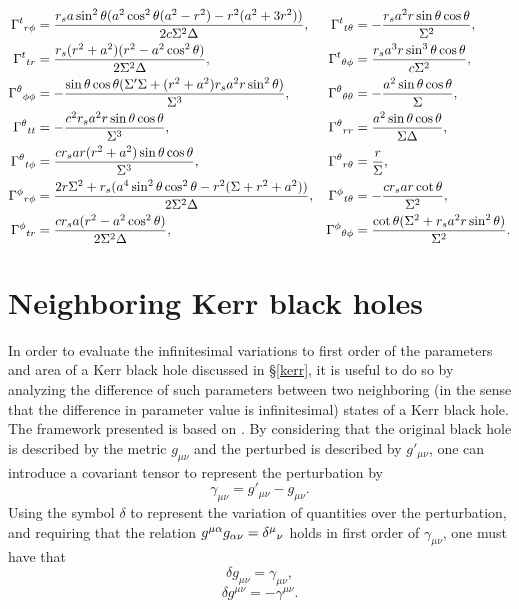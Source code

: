 \documentclass[
12pt,		%
openright,	%
twoside,  %
a4paper,			%
chapter=TITLE,		%
english,			%
french,				%
spanish,			%
brazil				%
]{USPSC-classe/USPSC}
\begin{document}
\begin{apendicesenv}
\begin{align*}
\Gamma^{t}\mathstrut_{r\phi}&=\frac{r_sa\sin^2{\theta}(a^2\cos^2{\theta}(a^2-r^2)-r^2(a^2+3r^2))}{2c\Sigma^2\Delta}, & \Gamma^{t}\mathstrut_{t\theta}&=-\frac{r_sa^2r\sin{\theta}\cos{\theta}}{\Sigma^2},\\
\Gamma^{t}\mathstrut_{tr}&=\frac{r_s(r^2+a^2)(r^2-a^2\cos^2{\theta})}{2\Sigma^2\Delta}, & \Gamma^{t}\mathstrut_{\theta\phi}&=\frac{r_sa^3r\sin^3{\theta}\cos{\theta}}{c\Sigma^2},\\
\Gamma^{\theta}\mathstrut_{\phi\phi}& =-\frac{\sin{\theta}\cos{\theta}(\Sigma'\Sigma+(r^2+a^2)r_sa^2r\sin^2{\theta})}{\Sigma^3},  &  \Gamma^{\theta}\mathstrut_{\theta\theta}&=-\frac{a^2\sin{\theta\cos{\theta}}}{\Sigma},\\
\Gamma^{\theta}\mathstrut_{tt}&=-\frac{c^2r_sa^2r\sin{\theta}\cos{\theta}}{\Sigma^3}, &  \Gamma^{\theta}\mathstrut_{rr}&=\frac{a^2\sin{\theta}\cos{\theta}}{\Sigma\Delta},\\
 \Gamma^{\theta}\mathstrut_{t\phi}&=\frac{cr_sar(r^2+a^2)\sin{\theta}\cos{\theta}}{\Sigma^3}, & \Gamma^{\theta}\mathstrut_{r\theta}&=\frac{r}{\Sigma},\\
 \Gamma^{\phi}\mathstrut_{r\phi}&=\frac{2r\Sigma^2+r_s(a^4\sin^2{\theta}\cos^2{\theta}-r^2(\Sigma+r^2+a^2))}{2\Sigma^2\Delta}, &  \Gamma^{\phi}\mathstrut_{t\theta}&=-\frac{cr_sar\cot{\theta}}{\Sigma^2},\\
 \Gamma^{\phi}\mathstrut_{tr}&=\frac{cr_sa(r^2-a^2\cos^2{\theta})}{2\Sigma^2\Delta}, &  \Gamma^{\phi}\mathstrut_{\theta\phi}&=\frac{\cot{\theta}(\Sigma^2+r_sa^2r\sin^2{\theta})}{\Sigma^2}.
\end{align*}

\section{Neighboring Kerr black holes}\label{B2}

In order to evaluate the infinitesimal variations to first order of the parameters and area of a Kerr black hole discussed in \S\;\ref{kerr}, it is useful to do so by analyzing the difference of such parameters between two neighboring (in the sense that the difference in parameter value is infinitesimal) states of a Kerr black hole. The framework presented is based on \cite{Bardeen1973}. By considering that the original black hole is described by the metric $g_{\mu\nu}$ and the perturbed is described by $g'_{\mu\nu}$, one can introduce a covariant tensor to represent the perturbation by
\begin{equation}\label{B000}
    \gamma_{\mu\nu}=g'_{\mu\nu}-g_{\mu\nu}.
\end{equation}
Using the symbol $\delta$ to represent the variation of quantities over the perturbation, and requiring that the relation $g^{\mu\alpha}g_{\alpha\nu}=\delta^{\mu}\mathstrut_{\nu}$ holds in first order of $\gamma_{\mu\nu}$, one must have that
\begin{equation}
    \delta g_{\mu\nu}=\gamma_{\mu\nu},
       \end{equation}
    \begin{equation}
    \delta g^{\mu\nu}=-\gamma^{\mu\nu}.
\end{equation}


\end{apendicesenv}
\end{document}
